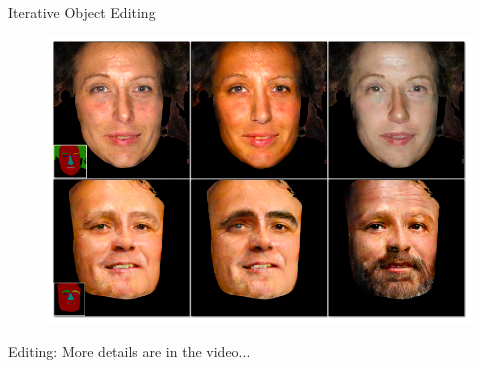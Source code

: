 \documentclass{beamer}
\begin{document}
\begin{frame}{Iterative Object Editing}
\begin{figure}
	\centering
	\includegraphics[height=0.6\textheight]{images/result_4}
\end{figure}
%
%
\begin{beamerboxesrounded}[upper=uppercol,lower=lowercol,shadow=false]{Editing: }
More details are in the video...
\end{beamerboxesrounded}
\end{frame}
\end{document}
